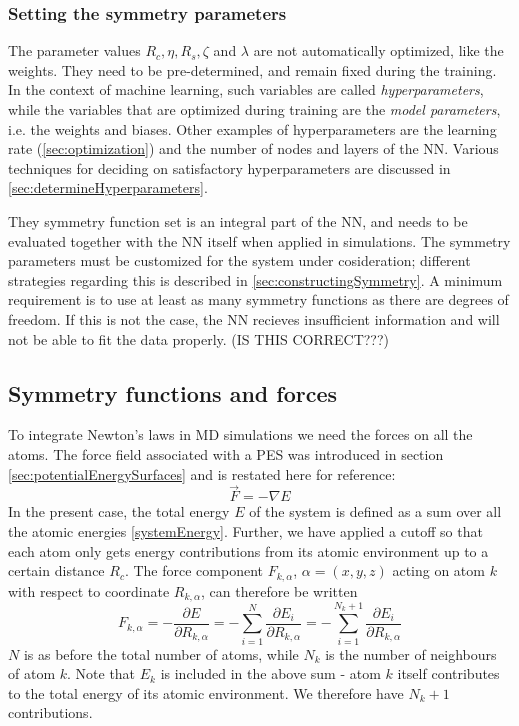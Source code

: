 \documentclass[twoside,english]{uiofysmaster}
\begin{document}
\subsubsection{Setting the symmetry parameters}
The parameter values $R_c, \eta, R_s, \zeta$ and $\lambda$ are not automatically optimized, like the weights. 
They need to be pre-determined, and remain fixed during the training. In the context of machine learning, such variables are called
\textit{hyperparameters}, while the variables that are optimized during training are the \textit{model parameters}, i.e. 
the weights and biases. Other examples of hyperparameters are the learning rate (\autoref{sec:optimization}) and 
the number of nodes and layers of the NN. Various techniques for deciding on satisfactory hyperparameters are 
discussed in \autoref{sec:determineHyperparameters}. 

They symmetry function set is
an integral part of the NN, and needs to be evaluated together with the NN itself when applied in simulations. 
The symmetry parameters must be customized for the system under cosideration; different strategies regarding this
is described in \autoref{sec:constructingSymmetry}. A minimum requirement is
to use at least as many symmetry functions as there are degrees of freedom.
If this is not the case, the NN recieves insufficient information and will not be able to fit the data properly.
(IS THIS CORRECT???)


\subsection{Symmetry functions and forces} \label{sec:symmAndForces}
To integrate Newton's laws in MD simulations we need the forces on all the atoms. The force field associated with a PES
was introduced in section \ref{sec:potentialEnergySurfaces} and is restated here for reference:
\begin{equation}
 \vec{F} = -\nabla E
 \label{forcePES2}
\end{equation}
In the present case, the total energy $E$ of the system is defined as a sum over all the atomic energies \eqref{systemEnergy}. 
Further, we have applied a cutoff so that each atom only gets energy contributions from its atomic environment up 
to a certain distance $R_c$.
The force component $F_{k,\alpha}$, $\alpha = (x,y,z)$ acting on atom $k$ with respect to coordinate $R_{k,\alpha}$,
can therefore be written \cite{Behler11symmetry}
\begin{equation}
 F_{k,\alpha} = -\frac{\partial E}{\partial R_{k,\alpha}} = -\sum_{i=1}^N\frac{\partial E_i}{\partial R_{k,\alpha}}
 = -\sum_{i=1}^{N_k+1}\frac{\partial E_i}{\partial R_{k,\alpha}}
 \label{forceAtomk}
\end{equation}
$N$ is as before the total number of atoms, while $N_k$ is the number of neighbours of atom $k$. 
Note that $E_k$ is included in the above sum - atom $k$ itself contributes to the total energy of its atomic
environment. We therefore have $N_k+1$ contributions. 
\end{document}
